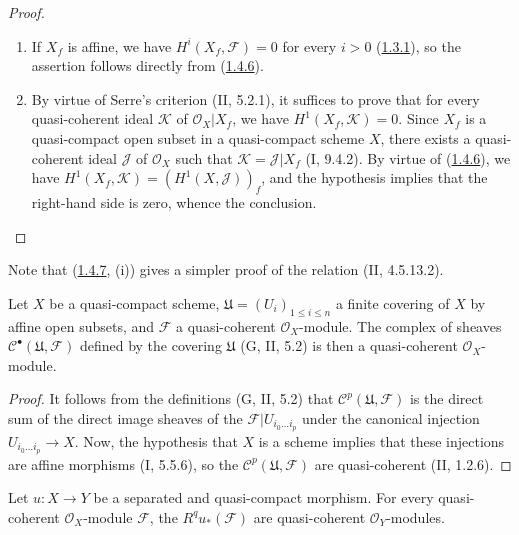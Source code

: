 \begin{proof}
\begin{enumerate}
\item[(i)] If $X_f$ is affine, we have $H^i(X_f,\mathcal F)=0$ for every
$i>0$ (\hyperref[III.1.3.1]{1.3.1}), so the assertion follows directly
from (\hyperref[III.1.4.6]{1.4.6}).
\item[(ii)] By virtue of Serre's criterion (II, 5.2.1), it suffices to prove
that for every quasi-coherent ideal $\mathcal K$ of
$\mathcal O_X\vert X_f$, we have $H^1(X_f,\mathcal K)=0$. Since $X_f$ is a
quasi-compact open subset in a quasi-compact scheme $X$, there exists a
quasi-coherent ideal $\mathcal J$ of $\mathcal O_X$ such that
$\mathcal K=\mathcal J\vert X_f$ (I, 9.4.2). By virtue of
(\hyperref[III.1.4.6]{1.4.6}), we have
$H^1(X_f,\mathcal K)=(H^1(X,\mathcal J))_f$, and the hypothesis implies that
the right-hand side is zero, whence the conclusion.
\end{enumerate}
\end{proof}

\begin{remark}[1.4.8]
\label{III.1.4.8}
Note that (\hyperref[III.1.4.7]{1.4.7}, (i)) gives a simpler
proof of the relation (II, 4.5.13.2).
\end{remark}

\begin{lemma}[1.4.9]
\label{III.1.4.9}
Let $X$ be a quasi-compact scheme,
$\mathfrak U=(U_i)_{1\leq i\leq n}$ a finite covering of $X$ by affine
open subsets, and $\mathcal F$ a quasi-coherent $\mathcal O_X$-module. The
complex of sheaves $\mathcal C^\bullet(\mathfrak U,\mathcal F)$ defined
by the covering $\mathfrak U$ (G, II, 5.2) is then a quasi-coherent
$\mathcal O_X$-module.
\end{lemma}

\begin{proof}
It follows from the definitions (G, II, 5.2) that
$\mathcal C^p(\mathfrak U,\mathcal F)$ is the direct sum of the direct image
sheaves of the $\mathcal F\vert U_{i_0\ldots i_p}$ under the canonical
injection $U_{i_0\ldots i_p}\to X$. Now, the hypothesis that $X$ is a scheme
implies that these injections are affine morphisms (I, 5.5.6), so the
$\mathcal C^p(\mathfrak U,\mathcal F)$ are quasi-coherent (II, 1.2.6).
\end{proof}

\begin{proposition}[1.4.10]
\label{III.1.4.10}
Let $u:X\to Y$ be a separated and quasi-compact morphism. For every
quasi-coherent $\mathcal O_X$-module $\mathcal F$, the
$R^qu_*(\mathcal F)$ are quasi-coherent $\mathcal O_Y$-modules.
\end{proposition}

